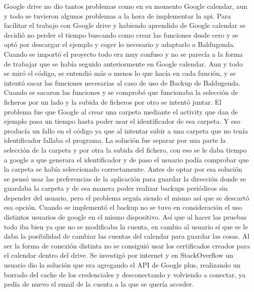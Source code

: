 Google drive no dio tantos problemas como en su momento Google calendar, aun y todo se tuvieron algunos problemas a la hora de implementar la api.
Para facilitar el trabajo con Google drive y habiendo aprendido de Google calendar se decidió no perder el tiempo buscando como crear las funciones desde cero y se optó por descargar el ejemplo y coger lo necesario y adaptarlo a Baldugenda.
Cuando se importó el proyecto todo era muy confuso y no se parecía a la forma de trabajar que se había seguido anteriormente en Google calendar.
Aun y todo se miró el código, se entendió más o menos lo que hacía en cada función,  y se intentó sacar las funciones necesarias al caso de uso de Backup de Baldugenda.
Cuando se sacaron las funciones y se comprobó que funcionaba la selección de ficheros por un lado y la subida de ficheros por otro se intentó juntar.
El problema fue que Google al crear una carpeta mediante el activity que dan de ejemplo pasa un tiempo hasta poder usar el identificador de esa carpeta. Y eso producía un fallo en el código ya que al intentar subir a una carpeta que no tenía identificador fallaba el programa.
La solución fue separar por una parte la selección de la carpeta y por otra la subida del fichero, con eso se le daba tiempo a google a que generara el identificador y de paso el usuario podía comprobar que la carpeta se había seleccionado correctamente.
Antes de optar por esa solución se pensó usar las preferencias de la aplicación para guardar la dirección donde se guardaba la carpeta y de esa manera poder realizar backups periódicos sin depender del usuario, pero el problema seguía siendo el mismo así que se descartó esa opción.
Cuando se implementó el backup no se tuvo en consideración el uso distintos usuarios de google en el mismo dispositivo. Así que al hacer las pruebas todo iba bien ya que no se modificaba la cuenta, en cambio al usuario sí que se le daba la posibilidad de cambiar las cuentas del calendar para guardar las cosas. Al ser la forma de conexión distinta no se consiguió usar los certificados creados para el calendar dentro del drive.
Se investigó por internet y en StackOverflow un usuario dio la solución que era agregando el API de Google plus, realizando un borrado del cache de los credenciales y desconectando y volviendo a conectar, ya pedía de nuevo el email de la cuenta a la que se quería acceder.
